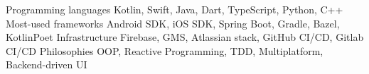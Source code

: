 
\begin{cvskills}
    \cvskill
        {Programming languages}
        {Kotlin, Swift, Java, Dart, TypeScript, Python, C++}
    \cvskill
        {Most-used frameworks} 
        {Android SDK, iOS SDK, Spring Boot, Gradle, Bazel, KotlinPoet}
    \cvskill
        {Infrastructure}
        {Firebase, GMS, Atlassian stack, GitHub CI/CD, Gitlab CI/CD}
    \cvskill
        {Philosophies}
        {OOP, Reactive Programming, TDD, Multiplatform, Backend-driven UI}
\end{cvskills}